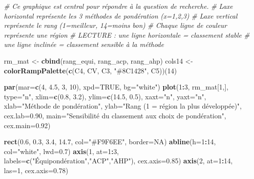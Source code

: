 \documentclass[
]{article}
\newenvironment{Shaded}{\begin{snugshade}}{\end{snugshade}}
\newcommand{\AttributeTok}[1]{\textcolor[rgb]{0.13,0.29,0.53}{#1}}
\newcommand{\CommentTok}[1]{\textcolor[rgb]{0.56,0.35,0.01}{\textit{#1}}}
\newcommand{\ConstantTok}[1]{\textcolor[rgb]{0.56,0.35,0.01}{#1}}
\newcommand{\DecValTok}[1]{\textcolor[rgb]{0.00,0.00,0.81}{#1}}
\newcommand{\FloatTok}[1]{\textcolor[rgb]{0.00,0.00,0.81}{#1}}
\newcommand{\FunctionTok}[1]{\textcolor[rgb]{0.13,0.29,0.53}{\textbf{#1}}}
\newcommand{\NormalTok}[1]{#1}
\newcommand{\OtherTok}[1]{\textcolor[rgb]{0.56,0.35,0.01}{#1}}
\newcommand{\SpecialCharTok}[1]{\textcolor[rgb]{0.81,0.36,0.00}{\textbf{#1}}}
\newcommand{\StringTok}[1]{\textcolor[rgb]{0.31,0.60,0.02}{#1}}
\begin{document}
\begin{Shaded}
\begin{Highlighting}[]
\CommentTok{\# Ce graphique est central pour répondre à la question de recherche.}
\CommentTok{\# L\textquotesingle{}axe horizontal représente les 3 méthodes de pondération (x=1,2,3)}
\CommentTok{\# L\textquotesingle{}axe vertical représente le rang (1=meilleur, 14=moins bon)}
\CommentTok{\# Chaque ligne de couleur représente une région}
\CommentTok{\# LECTURE : une ligne horizontale = classement stable}
\CommentTok{\#           une ligne inclinée = classement sensible à la méthode}

\NormalTok{rm\_mat }\OtherTok{\textless{}{-}} \FunctionTok{cbind}\NormalTok{(rang\_equi, rang\_acp, rang\_ahp)}
\NormalTok{cols14 }\OtherTok{\textless{}{-}} \FunctionTok{colorRampPalette}\NormalTok{(}\FunctionTok{c}\NormalTok{(C4, CV, C3, }\StringTok{"\#8C1428"}\NormalTok{, C5))(}\DecValTok{14}\NormalTok{)}

\FunctionTok{par}\NormalTok{(}\AttributeTok{mar=}\FunctionTok{c}\NormalTok{(}\DecValTok{4}\NormalTok{, }\FloatTok{4.5}\NormalTok{, }\DecValTok{3}\NormalTok{, }\DecValTok{10}\NormalTok{), }\AttributeTok{xpd=}\ConstantTok{TRUE}\NormalTok{, }\AttributeTok{bg=}\StringTok{"white"}\NormalTok{)}
\FunctionTok{plot}\NormalTok{(}\DecValTok{1}\SpecialCharTok{:}\DecValTok{3}\NormalTok{, rm\_mat[}\DecValTok{1}\NormalTok{,], }\AttributeTok{type=}\StringTok{"n"}\NormalTok{,}
     \AttributeTok{xlim=}\FunctionTok{c}\NormalTok{(}\FloatTok{0.8}\NormalTok{, }\FloatTok{3.2}\NormalTok{), }\AttributeTok{ylim=}\FunctionTok{c}\NormalTok{(}\FloatTok{14.5}\NormalTok{, }\FloatTok{0.5}\NormalTok{),}
     \AttributeTok{xaxt=}\StringTok{"n"}\NormalTok{, }\AttributeTok{yaxt=}\StringTok{"n"}\NormalTok{,}
     \AttributeTok{xlab=}\StringTok{"Méthode de pondération"}\NormalTok{,}
     \AttributeTok{ylab=}\StringTok{"Rang (1 = région la plus développée)"}\NormalTok{,}
     \AttributeTok{cex.lab=}\FloatTok{0.90}\NormalTok{,}
     \AttributeTok{main=}\StringTok{"Sensibilité du classement aux choix de pondération"}\NormalTok{,}
     \AttributeTok{cex.main=}\FloatTok{0.92}\NormalTok{)}

\FunctionTok{rect}\NormalTok{(}\FloatTok{0.6}\NormalTok{, }\FloatTok{0.3}\NormalTok{, }\FloatTok{3.4}\NormalTok{, }\FloatTok{14.7}\NormalTok{, }\AttributeTok{col=}\StringTok{"\#F9F6EE"}\NormalTok{, }\AttributeTok{border=}\ConstantTok{NA}\NormalTok{)}
\FunctionTok{abline}\NormalTok{(}\AttributeTok{h=}\DecValTok{1}\SpecialCharTok{:}\DecValTok{14}\NormalTok{, }\AttributeTok{col=}\StringTok{"white"}\NormalTok{, }\AttributeTok{lwd=}\FloatTok{0.7}\NormalTok{)}
\FunctionTok{axis}\NormalTok{(}\DecValTok{1}\NormalTok{, }\AttributeTok{at=}\DecValTok{1}\SpecialCharTok{:}\DecValTok{3}\NormalTok{, }\AttributeTok{labels=}\FunctionTok{c}\NormalTok{(}\StringTok{"Équipondération"}\NormalTok{,}\StringTok{"ACP"}\NormalTok{,}\StringTok{"AHP"}\NormalTok{), }\AttributeTok{cex.axis=}\FloatTok{0.85}\NormalTok{)}
\FunctionTok{axis}\NormalTok{(}\DecValTok{2}\NormalTok{, }\AttributeTok{at=}\DecValTok{1}\SpecialCharTok{:}\DecValTok{14}\NormalTok{, }\AttributeTok{las=}\DecValTok{1}\NormalTok{, }\AttributeTok{cex.axis=}\FloatTok{0.78}\NormalTok{)}


\end{Highlighting}
\end{Shaded}
\end{document}
